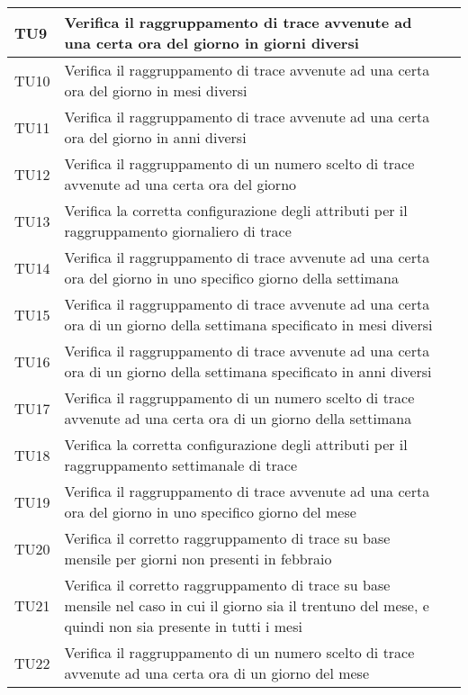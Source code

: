 \begin{longtable}{  | >{\centering\arraybackslash}m{2.5cm} 
						| >{\raggedright\arraybackslash}m{9cm} 
						| >{\centering\arraybackslash}m{3.5cm} | }
				TU9 & Verifica il raggruppamento di trace avvenute ad una certa ora del giorno in giorni diversi
						& \donetext{} \\ \hline
				TU10 & Verifica il raggruppamento di trace avvenute ad una certa ora del giorno in mesi diversi
						& \donetext{} \\ \hline
				TU11 & Verifica il raggruppamento di trace avvenute ad una certa ora del giorno in anni diversi
						& \donetext{} \\ \hline
				TU12 & Verifica il raggruppamento di un numero scelto di trace avvenute ad una certa ora del giorno
						& \donetext{} \\ \hline
				TU13 & Verifica la corretta configurazione degli attributi per il raggruppamento giornaliero di trace
						& \donetext{} \\ \hline			
				TU14 & Verifica il raggruppamento di trace avvenute ad una certa ora del giorno in uno specifico 
						giorno della settimana
						& \donetext{} \\ \hline
				TU15 & Verifica il raggruppamento di trace avvenute ad una certa ora di un giorno della settimana 
						specificato in mesi diversi
						& \donetext{} \\ \hline
				TU16 & Verifica il raggruppamento di trace avvenute ad una certa ora di un giorno della settimana 
						specificato in anni diversi
						& \donetext{} \\ \hline
				TU17 & Verifica il raggruppamento di un numero scelto di trace avvenute ad una certa ora di un giorno della settimana 
						& \donetext{} \\ \hline
				TU18 & Verifica la corretta configurazione degli attributi per il raggruppamento settimanale di trace
						& \donetext{} \\ \hline		
				TU19 & Verifica il raggruppamento di trace avvenute ad una certa ora del giorno in uno specifico 
						giorno del mese
						& \donetext{} \\ \hline
				TU20 & Verifica il corretto raggruppamento di trace su base mensile per giorni non presenti in febbraio
						& \donetext{} \\ \hline
				TU21 & Verifica il corretto raggruppamento di trace su base mensile nel caso in cui il giorno 
						sia il trentuno del mese, e quindi non sia presente in tutti i mesi
						& \donetext{} \\ \hline
				TU22 & Verifica il raggruppamento di un numero scelto di trace avvenute ad una certa ora di un giorno del mese 
						& \donetext{} \\ \hline

\end{longtable}
